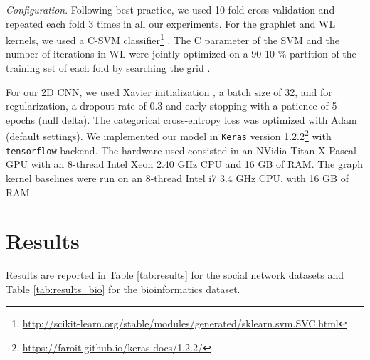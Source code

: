 \documentclass[runningheads]{llncs}
\begin{document}
\textit{Configuration}.
Following best practice, we used 10-fold cross validation and repeated each fold 3 times in all our experiments. For the graphlet and WL kernels, we used a C-SVM classifier\footnote{\scriptsize{\url{http://scikit-learn.org/stable/modules/generated/sklearn.svm.SVC.html}}} \cite{scikitlearn}. The C parameter of the SVM and the number of iterations in WL were jointly optimized on a 90-10 \% partition of the training set of each fold by searching the grid .

For our 2D CNN, we used Xavier initialization \cite{glorot2010understanding}, a batch size of 32, and for regularization, a dropout rate of 0.3 and early stopping with a patience of 5 epochs (null delta). The categorical cross-entropy loss was optimized with Adam \cite{kingma2014adam} (default settings). We implemented our model in \texttt{Keras} \cite{chollet2015keras} version 1.2.2\footnote{\scriptsize{\url{https://faroit.github.io/keras-docs/1.2.2/}}} with \texttt{tensorflow} \cite{abadi2016tensorflow} backend. The hardware used consisted in an NVidia Titan X Pascal GPU with an 8-thread Intel Xeon 2.40 GHz CPU and 16 GB of RAM. The graph kernel baselines were run on an 8-thread Intel i7 3.4 GHz CPU, with 16 GB of RAM.

\section{Results}
Results are reported in Table \ref{tab:results} for the social network datasets and Table \ref{tab:results_bio} for the bioinformatics dataset.

\vspace{-0.45cm}
\end{document}
